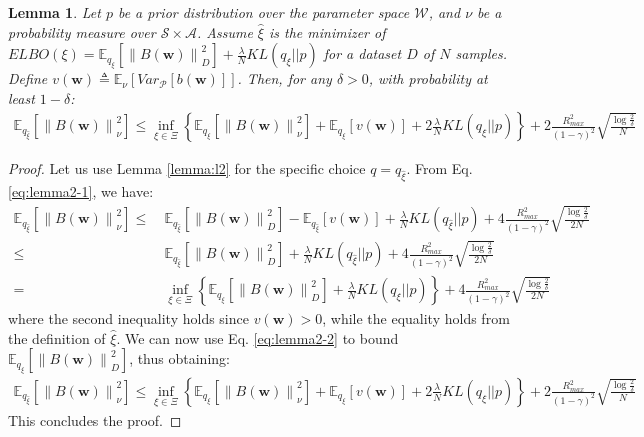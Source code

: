 \documentclass{article}
\newtheorem{lemma}{Lemma}
\newcommand{\wh}[1]{\widehat{#1}}
\newcommand{\norm}[1]{\left\lVert #1 \right\rVert}
\begin{document}
\begin{lemma}\label{lemma:general-bound}
Let $p$ be a prior distribution over the parameter space $\mathcal{W}$, and $\nu$ be a probability measure over $\mathcal{S}\times\mathcal{A}$. Assume $\wh{\xi}$ is the minimizer of $ELBO(\xi) = \mathbb{E}_{q_{\xi}}\left[ \norm{B(\bm{w})}_D^2 \right] + \frac{\lambda}{N} KL({q_{\xi}}||p)$ for a dataset $D$ of $N$ samples. Define $v(\bm{w}) \triangleq \mathbb{E}_{\nu}\left[Var_{\mathcal{P}}\left[b(\bm{w})\right]\right]$. Then, for any $\delta > 0$, with probability at least $1-\delta$:
\begin{align*}
\mathbb{E}_{q_{\wh{\xi}}}\left[ \norm{B(\bm{w})}_{\nu}^2 \right ] \leq \inf_{\xi \in \Xi}\left\{ \mathbb{E}_{q_{\xi}}\left[ \norm{B(\bm{w})}_{\nu}^2 \right ] + \mathbb{E}_{q_{\xi}}\left[ v(\bm{w}) \right] + 2\frac{\lambda}{N} KL({q_{\xi}}||p) \right\} + 2\frac{R_{max}^2}{(1-\gamma)^2}\sqrt{\frac{\log\frac{2}{\delta}}{N}}
\end{align*}
\end{lemma}
\begin{proof}
Let us use Lemma \ref{lemma:l2} for the specific choice $q=q_{\wh{\xi}}$. From Eq. \eqref{eq:lemma2-1}, we have:
\begin{align*}
\mathbb{E}_{q_{\wh{\xi}}}\left[ \norm{B(\bm{w})}_{\nu}^2 \right ] \leq\ & \mathbb{E}_{q_{\wh{\xi}}}\left[ \norm{B(\bm{w})}_D^2 \right] - \mathbb{E}_{q_{\wh{\xi}}}\left[ v(\bm{w}) \right] + \frac{\lambda}{N} KL({q_{\wh{\xi}}}||p) + 4\frac{R_{max}^2}{(1-\gamma)^2}\sqrt{\frac{\log\frac{2}{\delta}}{2N}}\\ \leq\ & \mathbb{E}_{q_{\wh{\xi}}}\left[ \norm{B(\bm{w})}_D^2 \right] + \frac{\lambda}{N} KL({q_{\wh{\xi}}}||p) + 4\frac{R_{max}^2}{(1-\gamma)^2}\sqrt{\frac{\log\frac{2}{\delta}}{2N}}\\ =\ & \inf_{\xi \in \Xi}\left\{ \mathbb{E}_{q_{\xi}}\left[ \norm{B(\bm{w})}_D^2 \right] + \frac{\lambda}{N} KL({q_{\xi}}||p) \right\} + 4\frac{R_{max}^2}{(1-\gamma)^2}\sqrt{\frac{\log\frac{2}{\delta}}{2N}}
\end{align*}
where the second inequality holds since $v(\bm{w}) > 0$, while the equality holds from the definition of $\wh{\xi}$. We can now use Eq. \eqref{eq:lemma2-2} to bound $\mathbb{E}_{q_{\xi}}\left[ \norm{B(\bm{w})}_D^2 \right]$, thus obtaining:
\begin{align*}
\mathbb{E}_{q_{\wh{\xi}}}\left[ \norm{B(\bm{w})}_{\nu}^2 \right ] \leq \inf_{\xi \in \Xi}\left\{ \mathbb{E}_{q_{\xi}}\left[ \norm{B(\bm{w})}_{\nu}^2 \right ] + \mathbb{E}_{q_{\xi}}\left[ v(\bm{w}) \right] + 2\frac{\lambda}{N} KL({q_{\xi}}||p) \right\} + 2\frac{R_{max}^2}{(1-\gamma)^2}\sqrt{\frac{\log\frac{2}{\delta}}{N}}
\end{align*}
This concludes the proof.
\end{proof}
\end{document}
